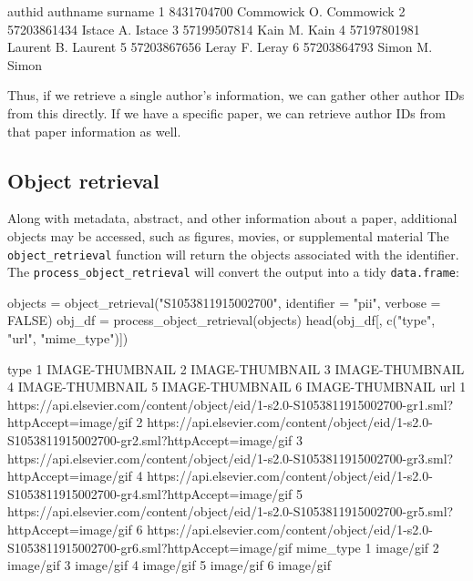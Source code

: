 \begin{Schunk}
\begin{Soutput}
       authid     authname   surname
1  8431704700 Commowick O. Commowick
2 57203861434    Istace A.    Istace
3 57199507814      Kain M.      Kain
4 57197801981   Laurent B.   Laurent
5 57203867656     Leray F.     Leray
6 57203864793     Simon M.     Simon
\end{Soutput}
\end{Schunk}

Thus, if we retrieve a single author's information, we can gather other
author IDs from this directly. If we have a specific paper, we can
retrieve author IDs from that paper information as well.

\hypertarget{object-retrieval}{%
\subsection{Object retrieval}\label{object-retrieval}}

Along with metadata, abstract, and other information about a paper,
additional objects may be accessed, such as figures, movies, or
supplemental material The \texttt{object\_retrieval} function will
return the objects associated with the identifier. The
\texttt{process\_object\_retrieval} will convert the output into a tidy
\texttt{data.frame}:

\begin{Schunk}
\begin{Sinput}
objects = object_retrieval("S1053811915002700", identifier = "pii", verbose = FALSE)
obj_df = process_object_retrieval(objects)
head(obj_df[, c("type", "url", "mime_type")])
\end{Sinput}
\begin{Soutput}
             type
1 IMAGE-THUMBNAIL
2 IMAGE-THUMBNAIL
3 IMAGE-THUMBNAIL
4 IMAGE-THUMBNAIL
5 IMAGE-THUMBNAIL
6 IMAGE-THUMBNAIL
                                                                                                url
1 https://api.elsevier.com/content/object/eid/1-s2.0-S1053811915002700-gr1.sml?httpAccept=image/gif
2 https://api.elsevier.com/content/object/eid/1-s2.0-S1053811915002700-gr2.sml?httpAccept=image/gif
3 https://api.elsevier.com/content/object/eid/1-s2.0-S1053811915002700-gr3.sml?httpAccept=image/gif
4 https://api.elsevier.com/content/object/eid/1-s2.0-S1053811915002700-gr4.sml?httpAccept=image/gif
5 https://api.elsevier.com/content/object/eid/1-s2.0-S1053811915002700-gr5.sml?httpAccept=image/gif
6 https://api.elsevier.com/content/object/eid/1-s2.0-S1053811915002700-gr6.sml?httpAccept=image/gif
  mime_type
1 image/gif
2 image/gif
3 image/gif
4 image/gif
5 image/gif
6 image/gif
\end{Soutput}
\end{Schunk}

